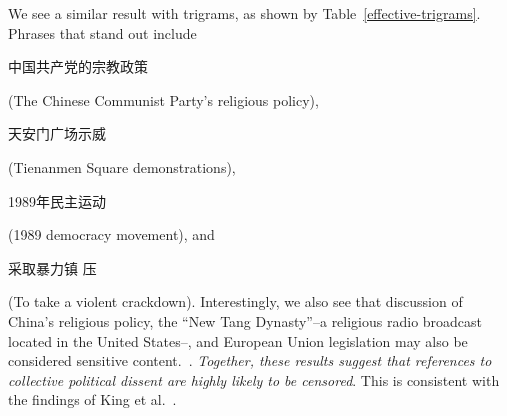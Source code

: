 We see a similar result with trigrams, as shown by
Table~\ref{effective-trigrams}. Phrases that stand out
include \begin{CJK*}{UTF8}{gbsn}中国共产党的宗教政策\end{CJK*} (The
Chinese Communist Party's religious policy), \begin{CJK*}{UTF8}{gbsn}
天安门广场示威\end{CJK*} (Tienanmen Square
demonstrations), \begin{CJK*}{UTF8}{gbsn}1989年民主运动\end{CJK*}
(1989 democracy movement), and \begin{CJK*}{UTF8}{gbsn}采取暴力镇
压\end{CJK*} (To take a violent crackdown). Interestingly, we also see
that discussion of China's religious policy, the ``New Tang
Dynasty''--a religious radio broadcast located in the United States--,
and European Union legislation may also be considered sensitive
content.~\cite{china-religion}. \textit{Together, these results
suggest that references to collective political dissent are highly
likely to be censored}. This is consistent with the findings of King
et al.~\cite{king2013censorship}.
